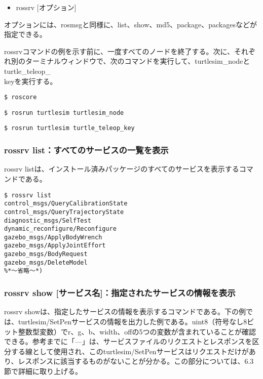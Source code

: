 \begin{itemize}
\item rossrv [オプション]
\end{itemize}

オプションには、rosmsgと同様に、list、show、md5、package、packagesなどが指定できる。

rossrvコマンドの例を示す前に、一度すべてのノードを終了する。次に、それぞれ別のターミナルウィンドウで、次のコマンドを実行して、turtlesim\_nodeとturtle\_teleop\_\\keyを実行する。

\begin{lstlisting}[language=ROS]
$ roscore
\end{lstlisting}

\begin{lstlisting}[language=ROS]
$ rosrun turtlesim turtlesim_node
\end{lstlisting}

\begin{lstlisting}[language=ROS]
$ rosrun turtlesim turtle_teleop_key
\end{lstlisting}


\subsubsection{rossrv list：すべてのサービスの一覧を表示}

rossrv listは、インストール済みパッケージのすべてのサービスを表示するコマンドである。

\begin{lstlisting}[language=ROS]
$ rossrv list
control_msgs/QueryCalibrationState
control_msgs/QueryTrajectoryState
diagnostic_msgs/SelfTest
dynamic_reconfigure/Reconfigure
gazebo_msgs/ApplyBodyWrench
gazebo_msgs/ApplyJointEffort
gazebo_msgs/BodyRequest
gazebo_msgs/DeleteModel
%*〜省略〜*)
\end{lstlisting}

\subsubsection{rossrv show [サービス名]：指定されたサービスの情報を表示}

rossrv showは、指定したサービスの情報を表示するコマンドである。下の例では、turtlesim/SetPenサービスの情報を出力した例である。uint8（符号なし8ビット整数型変数）でr、g、b、width、offの5つの変数が含まれていることが確認できる。参考までに「---」は、サービスファイルのリクエストとレスポンスを区分する線として使用され、このturtlesim/SetPenサービスはリクエストだけがあり、レスポンスに該当するものがないことが分かる。この部分については、6.3節で詳細に取り上げる。

